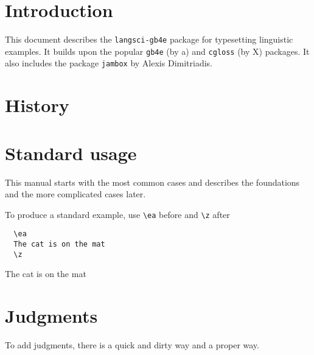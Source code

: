 \documentclass[output=guidelines]{langscibook}
\newcommand{\cmd}[1]{\texttt{\textbackslash#1}}
\begin{document}

%
%
%
%
%
%
%

\section{Introduction}
This document describes the \texttt{langsci-gb4e} package for typesetting linguistic examples. It builds upon the popular \texttt{gb4e} (by a) and \texttt{cgloss} (by X) packages. It also includes the package \texttt{jambox} by Alexis Dimitriadis. 
\section{History}
\section{Standard usage}
This manual starts with the most common cases and describes the foundations and the more complicated cases later. 

To produce a standard example, use \cmd{ea} before and \cmd{z} after
 
\begin{minipage}{.45\textwidth}
\begin{lstlisting}
  \ea 
  The cat is on the mat
  \z
\end{lstlisting}
\end{minipage}
\parbox[b]{.45\textwidth}{
  \ea 
  The cat is on the mat
  \z
  }

\section{Judgments}  
  To add judgments, there is a quick and dirty way and a proper way. 
\end{document}
